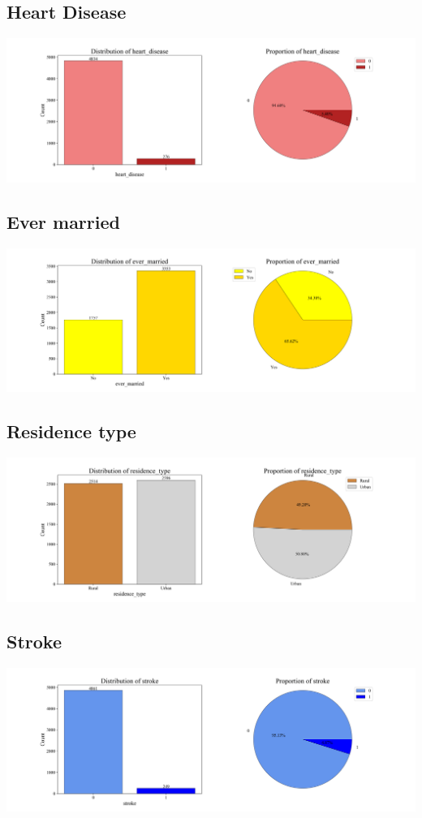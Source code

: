 \subsection{Heart Disease}
\includegraphics[width=13.5cm]{./images/heartd_bar_pie.png}

\subsection{Ever married}
\includegraphics[width=13.5cm]{./images/evermarry_bar_pie.png}

\subsection{Residence type}
\includegraphics[width=13.5cm]{./images/resit_bar_chart.png}

\subsection{Stroke}
\includegraphics[width=13.5cm]{./images/stroke_bar_pie.png}

